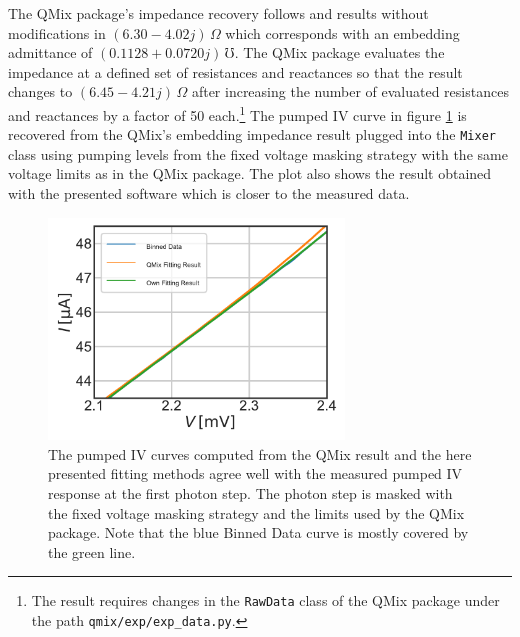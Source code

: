 \documentclass[]{article}
\begin{document}
The QMix package's impedance recovery follows \cite{Withington1995} and results without modifications in $(6.30 - 4.02j)\,\Omega$ which corresponds with an embedding admittance of $(0.1128 + 0.0720j)\,\mho$. 
The QMix package evaluates the impedance at a defined set of resistances and reactances so that the result changes to $(6.45 - 4.21j)\,\Omega$ after increasing the number of evaluated resistances and reactances by a factor of 50 each.\footnote{The result requires changes in the \texttt{RawData} class of the QMix package under the path \texttt{qmix/exp/exp\_data.py}.} 
The pumped IV curve in figure \ref{fig:Comparison_with_Johns_Embedding_Impedance} is recovered from the QMix's embedding impedance result plugged into the \texttt{Mixer} class using pumping levels from the fixed voltage masking strategy with the same voltage limits as in the QMix package.
The plot also shows the result obtained with the presented software which is closer to the measured data.


\begin{figure}
	\centering
	\includegraphics[width=0.7\textwidth]{../Mixer_Unit_Test/2020_01_14_GausMask/Comparison_with_Johns_Embedding_Impedance.pdf}
	\caption{The pumped IV curves computed from the QMix result and the here presented fitting methods agree well with the measured pumped IV response at the first photon step. The photon step is masked with the fixed voltage masking strategy and the limits used by the QMix package. Note that the blue Binned Data curve is mostly covered by the green line.}
	\label{fig:Comparison_with_Johns_Embedding_Impedance}
\end{figure}
\end{document}
